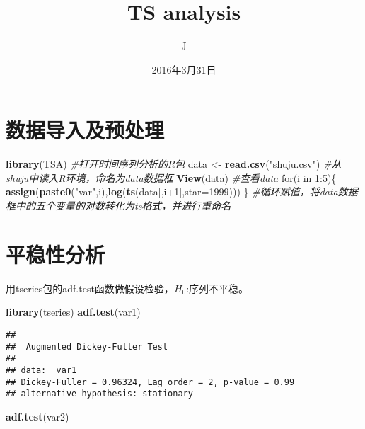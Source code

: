 \documentclass[]{article}
\title{TS analysis}
\author{J}
\date{2016年3月31日}
\newenvironment{Shaded}{\begin{snugshade}}{\end{snugshade}}
\newcommand{\KeywordTok}[1]{\textcolor[rgb]{0.13,0.29,0.53}{\textbf{{#1}}}}
\newcommand{\DataTypeTok}[1]{\textcolor[rgb]{0.13,0.29,0.53}{{#1}}}
\newcommand{\DecValTok}[1]{\textcolor[rgb]{0.00,0.00,0.81}{{#1}}}
\newcommand{\StringTok}[1]{\textcolor[rgb]{0.31,0.60,0.02}{{#1}}}
\newcommand{\CommentTok}[1]{\textcolor[rgb]{0.56,0.35,0.01}{\textit{{#1}}}}
\newcommand{\NormalTok}[1]{{#1}}
\begin{document}
\maketitle

\section{数据导入及预处理}

\begin{Shaded}
\begin{Highlighting}[]
\KeywordTok{library}\NormalTok{(TSA) }\CommentTok{#打开时间序列分析的R包}
\NormalTok{data <-}\StringTok{ }\KeywordTok{read.csv}\NormalTok{(}\StringTok{"shuju.csv"}\NormalTok{) }\CommentTok{#从shuju中读入R环境，命名为data数据框}
\KeywordTok{View}\NormalTok{(data) }\CommentTok{#查看data}
\NormalTok{for(i in }\DecValTok{1}\NormalTok{:}\DecValTok{5}\NormalTok{)\{}
  \KeywordTok{assign}\NormalTok{(}\KeywordTok{paste0}\NormalTok{(}\StringTok{"var"}\NormalTok{,i),}\KeywordTok{log}\NormalTok{(}\KeywordTok{ts}\NormalTok{(data[,i}\DecValTok{+1}\NormalTok{],}\DataTypeTok{star=}\DecValTok{1999}\NormalTok{)))}
\NormalTok{\}}
\CommentTok{#循环赋值，将data数据框中的五个变量的对数转化为ts格式，并进行重命名}
\end{Highlighting}
\end{Shaded}

\section{平稳性分析}

用tseries包的adf.test函数做假设检验，\(H_0\):序列不平稳。

\begin{Shaded}
\begin{Highlighting}[]
\KeywordTok{library}\NormalTok{(tseries)}
\KeywordTok{adf.test}\NormalTok{(var1)}
\end{Highlighting}
\end{Shaded}

\begin{verbatim}
## 
##  Augmented Dickey-Fuller Test
## 
## data:  var1
## Dickey-Fuller = 0.96324, Lag order = 2, p-value = 0.99
## alternative hypothesis: stationary
\end{verbatim}

\begin{Shaded}
\begin{Highlighting}[]
\KeywordTok{adf.test}\NormalTok{(var2)}
\end{Highlighting}
\end{Shaded}
\end{document}
